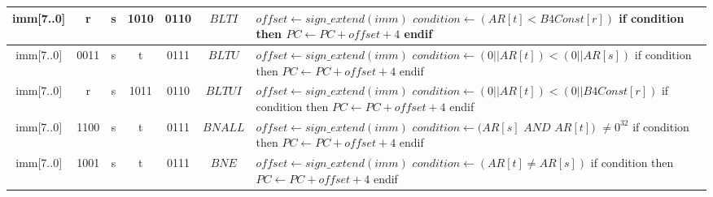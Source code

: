 \begin{longtable}{llllllllllllllllllllllll  p{1cm}  p{7cm} | }
        \multicolumn{8}{|c|}{imm[7..0]} & \multicolumn{4}{c|}{r} & \multicolumn{4}{c|}{s} & \multicolumn{4}{c|}{1010} & \multicolumn{4}{c|}{0110} & \multicolumn{1}{c|}{$BLTI$} & $offset \leftarrow sign\_extend(imm)$ \newline $condition \leftarrow (AR[t] < B4Const[r])$ \newline if     condition then \newline $PC \leftarrow PC + offset + 4$ \newline endif\\ \hline
		\multicolumn{8}{|c|}{imm[7..0]} & \multicolumn{4}{c|}{0011} & \multicolumn{4}{c|}{s} & \multicolumn{4}{c|}{t} & \multicolumn{4}{c|}{0111} & \multicolumn{1}{c|}{$BLTU$} & $offset \leftarrow sign\_extend(imm)$ \newline $condition \leftarrow (0||AR[t]) < (0||AR[s])$ \newline if condition then \newline $PC \leftarrow PC + offset + 4$ \newline endif\\ \hline
        \multicolumn{8}{|c|}{imm[7..0]} & \multicolumn{4}{c|}{r} & \multicolumn{4}{c|}{s} & \multicolumn{4}{c|}{1011} & \multicolumn{4}{c|}{0110} & \multicolumn{1}{c|}{$BLTUI$} & $offset \leftarrow sign\_extend(imm)$ \newline $condition \leftarrow (0||AR[t]) < (0||B4Const[r])$ \newline if condition then \newline $PC \leftarrow PC + offset + 4$ \newline endif\\ \hline
       \multicolumn{8}{|c|}{imm[7..0]} & \multicolumn{4}{c|}{1100} & \multicolumn{4}{c|}{s} & \multicolumn{4}{c|}{t} & \multicolumn{4}{c|}{0111} & \multicolumn{1}{c|}{$BNALL$} & $offset \leftarrow sign\_extend(imm)$ \newline $condition \leftarrow (AR[s]$ $AND$ $AR[t])$ $\neq0^{32}$ \newline if condition then \newline $PC \leftarrow PC + offset + 4$ \newline endif\\ \hline
	   \multicolumn{8}{|c|}{imm[7..0]} & \multicolumn{4}{c|}{1001} & \multicolumn{4}{c|}{s} & \multicolumn{4}{c|}{t} & \multicolumn{4}{c|}{0111} & \multicolumn{1}{c|}{$BNE$} & $offset \leftarrow sign\_extend(imm)$ \newline $condition \leftarrow (AR[t] \neq AR[s])$ \newline if condition then \newline $PC \leftarrow PC + offset + 4$ \newline endif\\ \hline

\end{longtable}

